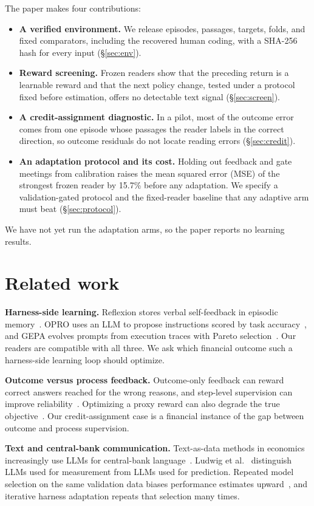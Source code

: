 \documentclass[sigconf]{acmart}
\begin{document}
The paper makes four contributions:
\begin{itemize}
\item \textbf{A verified environment.} We release episodes, passages, targets, folds, and fixed comparators, including the recovered human coding, with a SHA-256 hash for every input (\S\ref{sec:env}).
\item \textbf{Reward screening.} Frozen readers show that the preceding return is a learnable reward and that the next policy change, tested under a protocol fixed before estimation, offers no detectable text signal (\S\ref{sec:screen}).
\item \textbf{A credit-assignment diagnostic.} In a pilot, most of the outcome error comes from one episode whose passages the reader labels in the correct direction, so outcome residuals do not locate reading errors (\S\ref{sec:credit}).
\item \textbf{An adaptation protocol and its cost.} Holding out feedback and gate meetings from calibration raises the mean squared error (MSE) of the strongest frozen reader by 15.7\% before any adaptation. We specify a validation-gated protocol and the fixed-reader baseline that any adaptive arm must beat (\S\ref{sec:protocol}).
\end{itemize}
We have not yet run the adaptation arms, so the paper reports no learning results.

\section{Related work}

\textbf{Harness-side learning.} Reflexion stores verbal self-feedback in episodic memory~\cite{shinn2023reflexion}. OPRO uses an LLM to propose instructions scored by task accuracy~\cite{yang2024opro}, and GEPA evolves prompts from execution traces with Pareto selection~\cite{agrawal2025gepa}. Our readers are compatible with all three. We ask which financial outcome such a harness-side learning loop should optimize.

\textbf{Outcome versus process feedback.} Outcome-only feedback can reward correct answers reached for the wrong reasons, and step-level supervision can improve reliability~\cite{uesato2022process,lightman2024verify}. Optimizing a proxy reward can also degrade the true objective~\cite{skalse2022reward}. Our credit-assignment case is a financial instance of the gap between outcome and process supervision.

\textbf{Text and central-bank communication.} Text-as-data methods in economics~\cite{gentzkow2019text} increasingly use LLMs for central-bank language~\cite{hansen2023fedspeak,gambacorta2024cblm}. Ludwig et al.~\cite{ludwig2026} distinguish LLMs used for measurement from LLMs used for prediction. Repeated model selection on the same validation data biases performance estimates upward~\cite{cawley2010}, and iterative harness adaptation repeats that selection many times.
\end{document}
